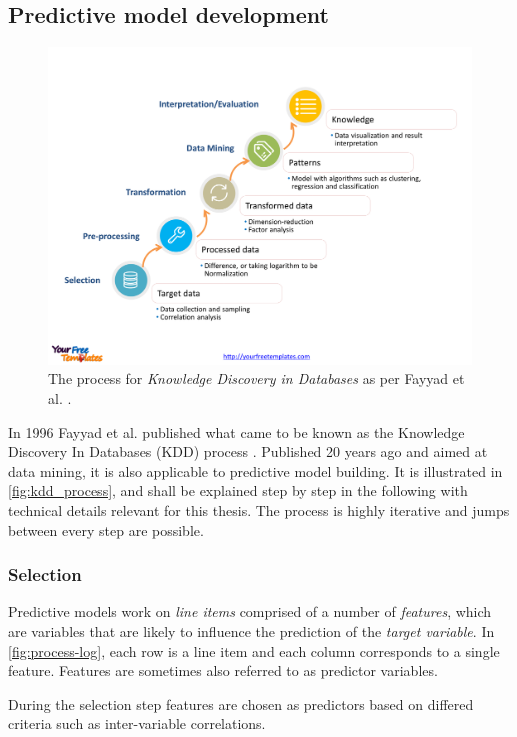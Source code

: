 \subsection{Predictive model development}
\begin{figure}
	\centering
	\includegraphics[width=\textwidth]{gfx/kdd_process.png}
	\caption{The process for \textit{Knowledge Discovery in Databases} as per Fayyad et al. \cite{fayyad1996data}.}
	\label{fig:kdd_process}
\end{figure}

In 1996 Fayyad et al. published what came to be known as the Knowledge Discovery In Databases (KDD) process \cite{fayyad1996data}. Published 20 years ago and aimed at data mining, it is also applicable to predictive model building. It is illustrated in \autoref{fig:kdd_process}, and shall be explained step by step in the following with technical details relevant for this thesis. The process is highly iterative and jumps between every step are possible.

\subsubsection*{Selection}
Predictive models work on \textit{line items} comprised of a number of \textit{features}, which are variables that are likely to influence the prediction of the \textit{target variable}. In \autoref{fig:process-log}, each row is a line item and each column corresponds to a single feature. Features are sometimes also referred to as predictor variables.

During the selection step features are chosen as predictors based on differed criteria such as inter-variable correlations.

